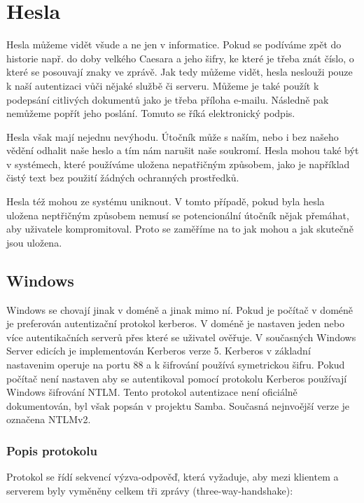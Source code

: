 

\chapter{Hesla}

Hesla můžeme vidět všude a ne jen v informatice. 
Pokud se podíváme zpět do historie např. do doby velkého Caesara a jeho šifry, ke které je třeba znát číslo, o které se posouvají znaky ve zprávě. 
Jak tedy můžeme vidět, hesla neslouži pouze k naší autentizaci vůči nějaké službě či serveru. 
Můžeme je také použít k podepsání citlivých dokumentů jako je třeba příloha e-mailu. 
Následně pak nemůžeme popřít jeho poslání. Tomuto se říká elektronický podpis. 

Hesla však mají nejednu nevýhodu. Útočník může s naším, nebo i bez našeho vědění odhalit naše heslo a tím nám narušit naše soukromí. Hesla mohou také být v systémech, které používáme uložena nepatřičným způsobem, jako je například čistý text bez použití žádných ochranných prostředků. 

Hesla též mohou ze systému uniknout. V tomto případě, pokud byla hesla uložena neptřičným způsobem nemusí se potencionální útočník nějak přemáhat, aby uživatele kompromitoval. Proto se zaměříme na to jak mohou a jak skutečně jsou uložena. 

\section{Windows}
Windows se chovají jinak v doméně a jinak mimo ní. Pokud je počítač v doméně je preferován autentizační protokol kerberos. V doméně je nastaven jeden nebo více autentikačních serverů přes které se uživatel ověřuje. V současných Windows Server edicích je implementován Kerberos verze 5. Kerberos v základní nastavenim operuje na portu 88 a k šifrování používá symetrickou šifru. 
Pokud počítač není nastaven aby se autentikoval pomocí protokolu Kerberos používají Windows šifrování NTLM. Tento protokol autentizace není oficiálně dokumentován, byl však popsán v projektu Samba. Současná nejnvoější verze je označena NTLMv2.

\subsection{Popis protokolu}

Protokol se řídí sekvencí výzva-odpověď, která vyžaduje, aby mezi klientem a serverem  byly vyměněny celkem tři zprávy (three-way-handshake):

